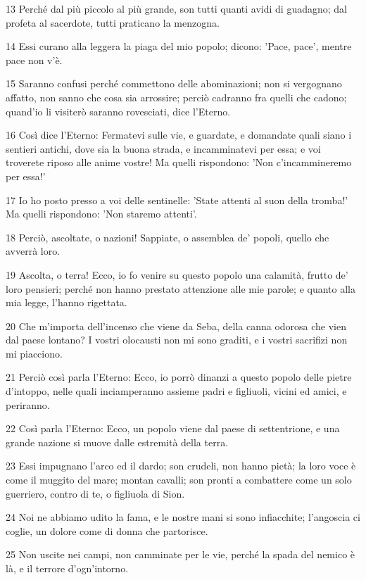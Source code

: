 \par 13 Perché dal più piccolo al più grande, son tutti quanti avidi di guadagno; dal profeta al sacerdote, tutti praticano la menzogna.
\par 14 Essi curano alla leggera la piaga del mio popolo; dicono: 'Pace, pace', mentre pace non v'è.
\par 15 Saranno confusi perché commettono delle abominazioni; non si vergognano affatto, non sanno che cosa sia arrossire; perciò cadranno fra quelli che cadono; quand'io li visiterò saranno rovesciati, dice l'Eterno.
\par 16 Così dice l'Eterno: Fermatevi sulle vie, e guardate, e domandate quali siano i sentieri antichi, dove sia la buona strada, e incamminatevi per essa; e voi troverete riposo alle anime vostre! Ma quelli rispondono: 'Non c'incammineremo per essa!'
\par 17 Io ho posto presso a voi delle sentinelle: 'State attenti al suon della tromba!' Ma quelli rispondono: 'Non staremo attenti'.
\par 18 Perciò, ascoltate, o nazioni! Sappiate, o assemblea de' popoli, quello che avverrà loro.
\par 19 Ascolta, o terra! Ecco, io fo venire su questo popolo una calamità, frutto de' loro pensieri; perché non hanno prestato attenzione alle mie parole; e quanto alla mia legge, l'hanno rigettata.
\par 20 Che m'importa dell'incenso che viene da Seba, della canna odorosa che vien dal paese lontano? I vostri olocausti non mi sono graditi, e i vostri sacrifizi non mi piacciono.
\par 21 Perciò così parla l'Eterno: Ecco, io porrò dinanzi a questo popolo delle pietre d'intoppo, nelle quali inciamperanno assieme padri e figliuoli, vicini ed amici, e periranno.
\par 22 Così parla l'Eterno: Ecco, un popolo viene dal paese di settentrione, e una grande nazione si muove dalle estremità della terra.
\par 23 Essi impugnano l'arco ed il dardo; son crudeli, non hanno pietà; la loro voce è come il muggito del mare; montan cavalli; son pronti a combattere come un solo guerriero, contro di te, o figliuola di Sion.
\par 24 Noi ne abbiamo udito la fama, e le nostre mani si sono infiacchite; l'angoscia ci coglie, un dolore come di donna che partorisce.
\par 25 Non uscite nei campi, non camminate per le vie, perché la spada del nemico è là, e il terrore d'ogn'intorno.
